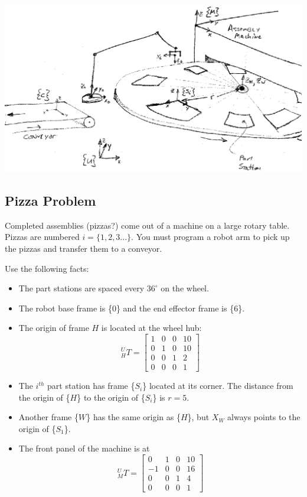 \begin{Example}
\includegraphics[width=6.4in]{figs02/00080.eps}


\subsection*{Pizza Problem}
Completed assemblies (pizzas?) come out of a machine on a large rotary
table. Pizzas are numbered $i=\{1,2,3 ...\}$.  You must program a robot arm to pick up the pizzas and transfer
them to a conveyor.


Use the following facts:

\begin{itemize}
	\item The part stations are spaced every $36^\circ$ on the wheel.

	\item The robot base frame is \{$0$\} and the end effector frame
is \{$6$\}.

	\item The origin of frame $H$ is located at the wheel hub:
\[
^U_HT =  \left[ \begin{array}{cccc}
1 & 0 & 0 & 10  \\
0 & 1 & 0 & 10 \\
0 & 0 & 1 & 2 \\
0 & 0 & 0 & 1
\end{array}  \right]
\]
	\item The $i^{th}$ part station has frame \{$S_i$\} located at its corner.
	The distance from the origin of \{$H$\} to the origin of \{$S_i$\}
	is $r=5$.
	\item Another frame \{$W$\} has the same origin as \{$H$\}, but $X_W$
always points to the origin of \{$S_1$\}.

	\item The front panel of the machine is at
\[
^U_MT =  \left[ \begin{array}{cccc}
0  & 1 & 0 & 10  \\
-1 & 0  &0  & 16 \\
0 & 0 & 1 & 4 \\
0 & 0 & 0 & 1
\end{array}  \right]
\]


\end{itemize}
\end{Example}
